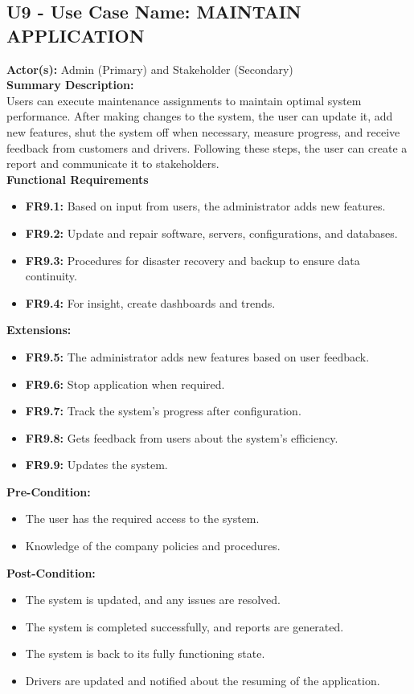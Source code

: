 \documentclass[9pt]{report}
\begin{document}
\subsection*{U9 - Use Case Name: MAINTAIN APPLICATION}
\textbf{Actor(s):} Admin (Primary) and Stakeholder (Secondary)
\textbf{\\Summary Description:} \\Users can execute maintenance assignments to maintain optimal system performance. After making changes to the system, the user can update it, add new features, shut the system off when necessary, measure progress, and receive feedback from customers and drivers. Following these steps, the user can create a report and communicate it to stakeholders.\\
\textbf{Functional Requirements}
\begin{itemize}
    \item \textbf{FR9.1:} Based on input from users, the administrator adds new features.
    \item \textbf{FR9.2:} Update and repair software, servers, configurations, and databases.
    \item \textbf{FR9.3:} Procedures for disaster recovery and backup to ensure data continuity.
    \item \textbf{FR9.4:} For insight, create dashboards and trends.
\end{itemize}
\textbf{Extensions:}
\begin{itemize}
    \item \textbf{FR9.5:} The administrator adds new features based on user feedback.
    \item \textbf{FR9.6:} Stop application when required.
    \item \textbf{FR9.7:} Track the system's progress after configuration.
    \item \textbf{FR9.8:} Gets feedback from users about the system's efficiency.
    \item \textbf{FR9.9:} Updates the system.
\end{itemize}
\textbf{Pre-Condition:}
\begin{itemize}
    \item The user has the required access to the system.
    \item Knowledge of the company policies and procedures.
\end{itemize}
\textbf{Post-Condition:} 
\begin{itemize}
    \item The system is updated, and any issues are resolved.
    \item The system is completed successfully, and reports are generated.
    \item The system is back to its fully functioning state.
    \item Drivers are updated and notified about the resuming of the application.
\end{itemize}
\end{document}
